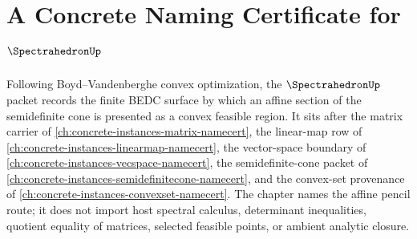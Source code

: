 \chapter{A Concrete Naming Certificate for $\SpectrahedronUp$}
\label{ch:concrete-instances-spectrahedron-namecert}

Following Boyd--Vandenberghe convex optimization, the $\SpectrahedronUp$ packet records the finite BEDC surface by which an affine section of the semidefinite cone is presented as a convex feasible region. It sits after the matrix carrier of \autoref{ch:concrete-instances-matrix-namecert}, the linear-map row of \autoref{ch:concrete-instances-linearmap-namecert}, the vector-space boundary of \autoref{ch:concrete-instances-vecspace-namecert}, the semidefinite-cone packet of \autoref{ch:concrete-instances-semidefinitecone-namecert}, and the convex-set provenance of \autoref{ch:concrete-instances-convexset-namecert}. The chapter names the affine pencil route; it does not import host spectral calculus, determinant inequalities, quotient equality of matrices, selected feasible points, or ambient analytic closure.


